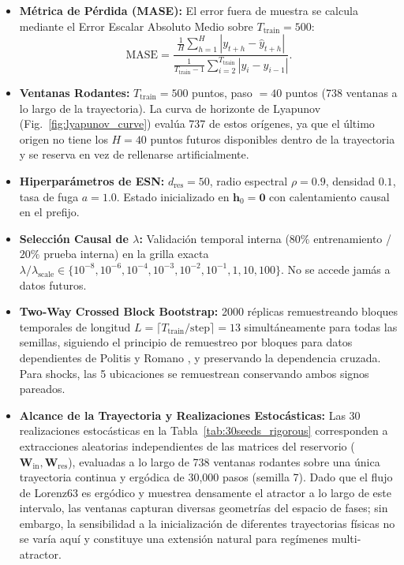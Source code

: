 \documentclass[aip,cha,reprint,amsmath,amssymb]{revtex4-2}
\begin{document}
\begin{itemize}
    \item \textbf{Métrica de Pérdida (MASE):} El error fuera de muestra se calcula mediante el Error Escalar Absoluto Medio sobre $T_{\text{train}}=500$:
    \begin{equation}
    \text{MASE} = \frac{\frac{1}{H}\sum_{h=1}^H |y_{t+h} - \hat{y}_{t+h}|}{\frac{1}{T_{\text{train}}-1}\sum_{i=2}^{T_{\text{train}}} |y_i - y_{i-1}|}.
    \end{equation}
    \item \textbf{Ventanas Rodantes:} $T_{\text{train}} = 500$ puntos, paso $= 40$ puntos (738 ventanas a lo largo de la trayectoria). La curva de horizonte de Lyapunov (Fig.~\ref{fig:lyapunov_curve}) evalúa 737 de estos orígenes, ya que el último origen no tiene los $H=40$ puntos futuros disponibles dentro de la trayectoria y se reserva en vez de rellenarse artificialmente.
    \item \textbf{Hiperparámetros de ESN:} $d_{\text{res}} = 50$, radio espectral $\rho = 0.9$, densidad $0.1$, tasa de fuga $a = 1.0$. Estado inicializado en $\mathbf{h}_0 = \mathbf{0}$ con calentamiento causal en el prefijo.
    \item \textbf{Selección Causal de $\lambda$:} Validación temporal interna ($80\%$ entrenamiento / $20\%$ prueba interna) en la grilla exacta $\lambda / \lambda_{\text{scale}} \in \{10^{-8}, 10^{-6}, 10^{-4}, 10^{-3}, 10^{-2}, 10^{-1}, 1, 10, 100\}$. No se accede jamás a datos futuros.
    \item \textbf{Two-Way Crossed Block Bootstrap:} 2000 réplicas remuestreando bloques temporales de longitud $L = \lceil T_{\text{train}} / \text{step} \rceil = 13$ simultáneamente para todas las semillas, siguiendo el principio de remuestreo por bloques para datos dependientes de Politis y Romano \cite{politis1994stationary}, y preservando la dependencia cruzada. Para shocks, las 5 ubicaciones se remuestrean conservando ambos signos pareados.
    \item \textbf{Alcance de la Trayectoria y Realizaciones Estocásticas:} Las 30 realizaciones estocásticas en la Tabla~\ref{tab:30seeds_rigorous} corresponden a extracciones aleatorias independientes de las matrices del reservorio ($\mathbf{W}_{\text{in}}, \mathbf{W}_{\text{res}}$), evaluadas a lo largo de 738 ventanas rodantes sobre una única trayectoria continua y ergódica de 30,000 pasos (semilla 7). Dado que el flujo de Lorenz63 es ergódico y muestrea densamente el atractor a lo largo de este intervalo, las ventanas capturan diversas geometrías del espacio de fases; sin embargo, la sensibilidad a la inicialización de diferentes trayectorias físicas no se varía aquí y constituye una extensión natural para regímenes multi-atractor.

\end{itemize}
\end{document}
